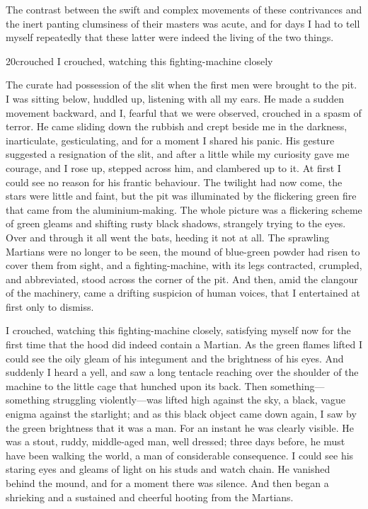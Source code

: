 The contrast between the swift and complex movements of these contrivances and the inert panting clumsiness of their masters was acute, and for days I had to tell myself repeatedly that these latter were indeed the living of the two things.


\begin{bwbigpic}
	[1.2] 
	{20crouched} 
	{I crouched, watching this fighting-machine closely}
\end{bwbigpic}

The curate had possession of the slit when the first men were brought to the pit. I was sitting below, huddled up, listening with all my ears. He made a sudden movement backward, and I, fearful that we were observed, crouched in a spasm of terror. He came sliding down the rubbish and crept beside me in the darkness, inarticulate, gesticulating, and for a moment I shared his panic. His gesture suggested a resignation of the slit, and after a little while my curiosity gave me courage, and I rose up, stepped across him, and clambered up to it. At first I could see no reason for his frantic behaviour. The twilight had now come, the stars were little and faint, but the pit was illuminated by the flickering green fire that came from the aluminium-making. The whole picture was a flickering scheme of green gleams and shifting rusty black shadows, strangely trying to the eyes. Over and through it all went the bats, heeding it not at all. The sprawling Martians were no longer to be seen, the mound of blue-green powder had risen to cover them from sight, and a fighting-machine, with its legs contracted, crumpled, and abbreviated, stood across the corner of the pit. And then, amid the clangour of the machinery, came a drifting suspicion of human voices, that I entertained at first only to dismiss.

I crouched, watching this fighting-machine closely, satisfying myself now for the first time that the hood did indeed contain a Martian. As the green flames lifted I could see the oily gleam of his integument and the brightness of his eyes. And suddenly I heard a yell, and saw a long tentacle reaching over the shoulder of the machine to the little cage that hunched upon its back. Then something—something struggling violently—was lifted high against the sky, a black, vague enigma against the starlight; and as this black object came down again, I saw by the green brightness that it was a man. For an instant he was clearly visible. He was a stout, ruddy, middle-aged man, well dressed; three days before, he must have been walking the world, a man of considerable consequence. I could see his staring eyes and gleams of light on his studs and watch chain. He vanished behind the mound, and for a moment there was silence. And then began a shrieking and a sustained and cheerful hooting from the Martians.



